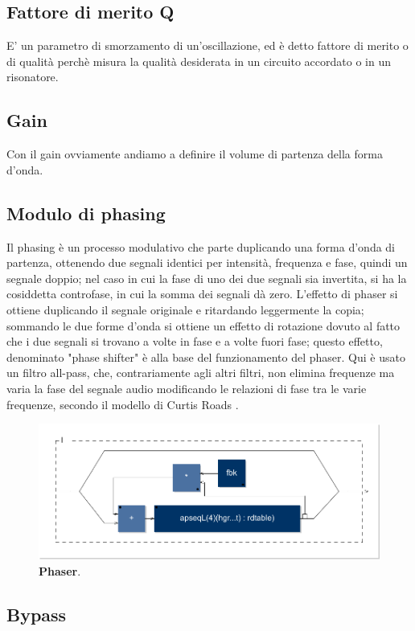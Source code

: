 \documentclass[
	a4paper,
	twocolumn
	]{article}
\begin{document}
\subsection*{Fattore di merito Q}

E' un parametro di smorzamento di un'oscillazione, ed è detto fattore di merito
o di qualità perchè misura la qualità desiderata in un circuito accordato o in
un risonatore.

\subsection*{Gain}

Con il gain ovviamente andiamo a definire il volume di partenza della forma
d’onda.

\subsection*{Modulo di phasing}

Il phasing è un processo modulativo che parte duplicando una forma d'onda di
partenza, ottenendo due segnali identici per intensità, frequenza e fase,
quindi un segnale doppio; nel caso in cui la fase di uno dei due segnali sia
invertita, si ha la cosiddetta controfase, in cui la somma dei segnali dà zero.
L'effetto di phaser si ottiene duplicando il segnale originale e ritardando
leggermente la copia; sommando le due forme d'onda si ottiene un effetto di
rotazione dovuto al fatto che i due segnali si trovano a volte in fase e a
volte fuori fase; questo effetto, denominato "phase shifter" è alla base del
funzionamento del phaser. Qui è usato un filtro all-pass, che, contrariamente
agli altri filtri, non elimina frequenze ma varia la fase del segnale audio
modificando le relazioni di fase tra le varie frequenze, secondo il modello di
Curtis Roads \cite{cr1996cmt}.

\begin{figure}[h]
\begin{center}
\includegraphics[width=.47\textwidth]{img/phaser.pdf}
\caption{\textbf{Phaser}.}
\label{phas}
\end{center}
\end{figure}

\subsection*{Bypass}
\end{document}
